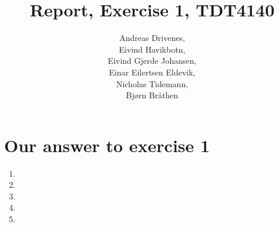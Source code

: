 \documentclass[english, a4paper]{article}
\title{Report, Exercise 1, TDT4140}
\author{	Andreas Drivenes,\\
		Eivind Havikbotn,\\
		Eivind Gjerde Johansen,\\
		Einar Eilertsen Eldevik,\\
		Nicholas Tidemann,\\
		Bjørn Bråthen\\
}
\begin{document}

\maketitle

\section{Our answer to exercise 1}
\begin{enumerate}

\item{}

\item{}

\item{}

\item{}
\newpage
\item{}

\end{enumerate}

\end{document}
